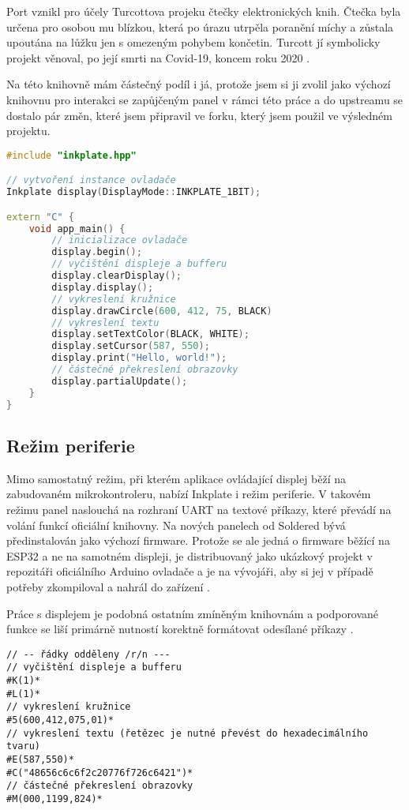 Port vznikl pro účely Turcottova projeku čtečky elektronických knih. Čtečka byla určena pro osobou mu blízkou, která po úrazu utrpěla poranění míchy a zůstala upoutána na lůžku jen s omezeným pohybem končetin. Turcott jí symbolicky projekt věnoval, po její smrti na Covid-19, koncem roku 2020 \cite{turcotteTurgu1EPubInkPlate2024}.

Na této knihovně mám částečný podíl i já, protože jsem si ji zvolil jako výchozí knihovnu pro interakci se zapůjčeným panel v rámci této práce a do upstreamu se dostalo pár změn, které jsem připravil ve forku, který jsem použil ve výsledném projektu.

\begin{lstlisting}[label=src:esp-idf-hello-world,language=C++,caption={Ukázka programu pro vykreslení kružnice a Hello World řetězce pomocí ESP-IDF knihovny}]
#include "inkplate.hpp"

// vytvoření instance ovladače
Inkplate display(DisplayMode::INKPLATE_1BIT);

extern "C" {
    void app_main() {
        // inicializace ovladače
        display.begin();
        // vyčištění displeje a bufferu
        display.clearDisplay();
        display.display();
        // vykreslení kružnice
        display.drawCircle(600, 412, 75, BLACK)
        // vykreslení textu
        display.setTextColor(BLACK, WHITE);
        display.setCursor(587, 550);
        display.print("Hello, world!");
        // částečné překreslení obrazovky
        display.partialUpdate();
    }
}
\end{lstlisting}

\subsection{Režim periferie}
Mimo samostatný režim, při kterém aplikace ovládající displej běží na zabudovaném mikrokontroleru, nabízí Inkplate i režim periferie. V takovém režimu panel naslouchá na rozhraní UART na textové příkazy, které převádí na volání funkcí oficiální knihovny. Na nových panelech od Soldered bývá předinstalován jako výchozí firmware. Protože se ale jedná o firmware běžící na ESP32 a ne na samotném displeji, je distribuovaný jako ukázkový projekt v repozitáři oficiálního Arduino ovladače a je na vývojáři, aby si jej v případě potřeby zkompiloval a nahrál do zařízení \cite{SolderedElectronicsInkplatePeripheralModeRaspberryPiExample2023}.

Práce s displejem je podobná ostatním zmíněným knihovnám a podporované funkce se liší primárně nutností korektně formátovat odesílané příkazy \cite{solderedelectronicsInkplatePeripheralMode}.

\begin{lstlisting}[label=src:PeripheralHelloWorld,caption={Ukázka příkazů pro vykreslení kružnice a Hello World řetězce v režimu periferie}]
// -- řádky odděleny /r/n ---
// vyčištění displeje a bufferu
#K(1)*
#L(1)*
// vykreslení kružnice
#5(600,412,075,01)*
// vykreslení textu (řetězec je nutné převést do hexadecimálního tvaru)
#E(587,550)*
#C("48656c6c6f2c20776f726c6421")*
// částečné překreslení obrazovky
#M(000,1199,824)*
\end{lstlisting}
